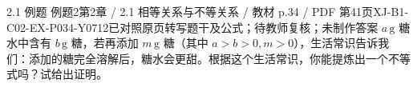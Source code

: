 \par\noindent\begin{minipage}{\linewidth}
\begin{bankitem}{2.1 例题 例题2}{第2章 / 2.1 相等关系与不等关系 / 教材 p.34 / PDF 第41页}{XJ-B1-C02-EX-P034-Y0712}{已对照原页转写题干及公式；待教师复核；未制作答案}
$a\,\mathrm g$ 糖水中含有 $b\,\mathrm g$ 糖，若再添加 $m\,\mathrm g$ 糖（其中 $a>b>0,m>0$），生活常识告诉我们：添加的糖完全溶解后，糖水会更甜。根据这个生活常识，你能提炼出一个不等式吗？试给出证明。
\end{bankitem}
\end{minipage}\par\medskip
